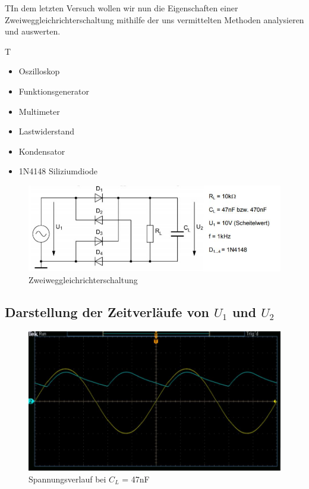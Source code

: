 \documentclass{article}
\begin{document}
\begin{task}
  TIn dem letzten Versuch wollen wir nun die Eigenschaften einer Zweiweggleichrichterschaltung mithilfe der uns vermittelten
  Methoden analysieren und auswerten.
\end{task}

\begin{devlist}
  T\begin{itemize}
    \item Oszilloskop
    \item Funktionsgenerator
    \item Multimeter
    \item Lastwiderstand
    \item Kondensator
    \item 1N4148 Siliziumdiode
  \end{itemize}
\end{devlist}

\begin{figure}[h]
  \begin{center}
    \includegraphics{../assets/images/EL1P2/aufgabe 4 schaltung.JPG}
    \caption{Zweiweggleichrichterschaltung}
  \end{center}
\end{figure}

\newpage

\subsection{Darstellung der Zeitverläufe von $U_1$ und $U_2$}

\begin{figure}[h]
  \begin{center}
    \includegraphics[scale=0.7]{../assets/images/EL1P2/aufgabe 4 47n.JPG}
    \caption{Spannungsverlauf bei $C_L$ = 47nF}
  \end{center}
\end{figure}
\end{document}
